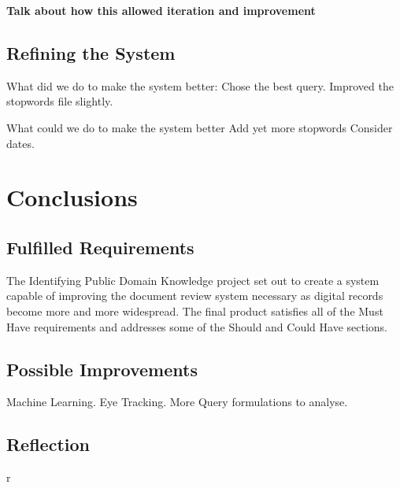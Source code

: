 \documentclass{l4proj}
\begin{document}
\textbf{Talk about how this allowed iteration and improvement}

\section{Refining the System}
What did we do to make the system better:
Chose the best query.
Improved the stopwords file slightly.

What could we do to make the system better
Add yet more stopwords
Consider dates.

\chapter{Conclusions} \label{conclusion}
\section{Fulfilled Requirements}
The Identifying Public Domain Knowledge project set out to create a system capable of improving the document review system necessary as digital records become more and more widespread.
The final product satisfies all of the Must Have requirements and addresses some of the Should and Could Have sections. 
\section{Possible Improvements}
Machine Learning. Eye Tracking. More Query formulations to analyse.

\section{Reflection}

\begin{appendices}  r

\end{appendices}




\end{document}
